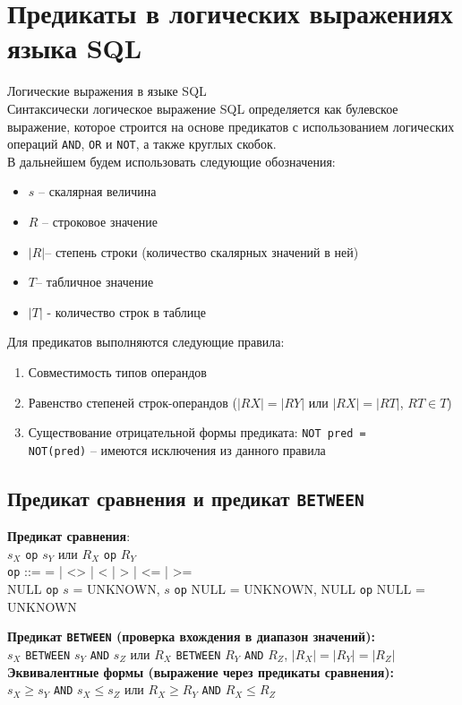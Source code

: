 \documentclass[a4paper,12pt]{article}
\begin{document}
\section{Предикаты в логических выражениях языка SQL}

Логические выражения в языке SQL\\
Синтаксически логическое выражение SQL определяется как булевское выражение, которое строится на основе предикатов с использованием логических операций \texttt{AND}, \texttt{OR} и \texttt{NOT}, а также круглых скобок.\\
В дальнейшем будем использовать следующие обозначения:
\begin{itemize}
    \item $s$ – скалярная величина
    \item $R$ – строковое значение
    \item $|R|$– степень строки (количество скалярных значений в ней)
    \item $T$– табличное значение
    \item $|T|$ - количество строк в таблице
\end{itemize}

Для предикатов выполняются следующие правила:
\begin{enumerate}
    \item Совместимость типов операндов
    \item Равенство степеней строк-операндов ($|RX| = |RY|$ или $|RX| = |RT|$, $RT \in T$)
    \item Существование отрицательной формы предиката: \texttt{NOT pred = \\ NOT(pred)} – имеются исключения из данного правила
\end{enumerate}

\subsection{Предикат сравнения и предикат \texttt{BETWEEN}}

\textbf{Предикат сравнения}:\\
$s_X$ \texttt{op} $s_Y$ или $R_X$ \texttt{op} $R_Y$\\
\texttt{op} ::= = | <> | < | > | <= | >=\\
NULL \texttt{op} $s$ = UNKNOWN, $s$ \texttt{op} NULL = UNKNOWN, NULL \texttt{op} NULL = UNKNOWN

\textbf{Предикат \texttt{BETWEEN} (проверка вхождения в диапазон значений):}\\
$s_X$ \texttt{BETWEEN} $s_Y$ \texttt{AND} $s_Z$ или $R_X$ \texttt{BETWEEN} $R_Y$ \texttt{AND} $R_Z$, $|R_X| = |R_Y| = |R_Z|$\\
\textbf{Эквивалентные формы (выражение через предикаты сравнения):}\\
$s_X \geq s_Y$ \texttt{AND} $s_X \leq s_Z$ или $R_X \geq R_Y$ \texttt{AND} $R_X \leq R_Z$
\end{document}
